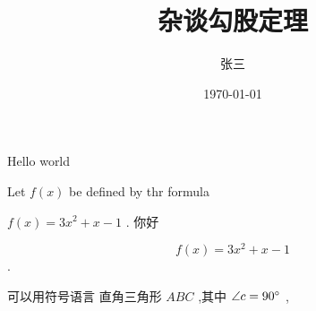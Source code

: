 \documentclass{ctexrep} %
\title{\heiti 杂谈勾股定理 }
\author{\kaishu 张三}
\date{\today}
\begin{document}
	
	Hello world 

	Let $f(x)$ be defined by thr formula 
	
	$f(x) = 3x^2+x-1$ .
		你好
	
		
	$$f(x) = 3x^2+x-1$$ .
	
	可以用符号语言  
	直角三角形 $ABC$ ,其中 $\angle c=90\degree $  ,
\end{document}
